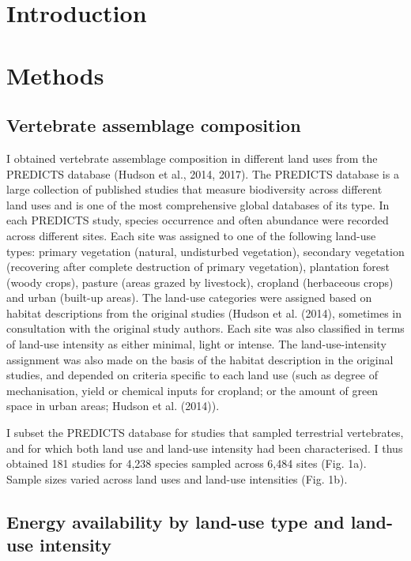 \section{Introduction}
  

\section{Methods}

\subsection{Vertebrate assemblage composition }

I obtained vertebrate assemblage composition in different land uses from the PREDICTS database (Hudson et al., 2014, 2017). The PREDICTS database is a large collection of published studies that measure biodiversity across different land uses and is one of the most comprehensive global databases of its type. In each PREDICTS study, species occurrence and often abundance were recorded across different sites. Each site was assigned to one of the following land-use types: primary vegetation (natural, undisturbed vegetation), secondary vegetation (recovering after complete destruction of primary vegetation), plantation forest (woody crops), pasture (areas grazed by livestock), cropland (herbaceous crops) and urban (built-up areas). The land-use categories were assigned based on habitat descriptions from the original studies (Hudson et al. (2014), sometimes in consultation with the original study authors. Each site was also classified in terms of land-use intensity as either minimal, light or intense. The land-use-intensity assignment was also made on the basis of the habitat description in the original studies, and depended on criteria specific to each land use (such as degree of mechanisation, yield or chemical inputs for cropland; or the amount of green space in urban areas; Hudson et al. (2014)).  

I subset the PREDICTS database for studies that sampled terrestrial vertebrates, and for which both land use and land-use intensity had been characterised. I thus obtained 181 studies for 4,238 species sampled across 6,484 sites (Fig. 1a). Sample sizes varied across land uses and land-use intensities (Fig. 1b). 

\subsection{Energy availability by land-use type and land-use intensity}


